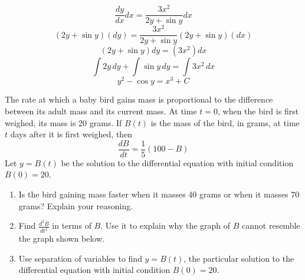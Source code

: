 \begin{Answer}[ref = diffeq1]
	$$\frac{dy}{dx} dx = \frac{3x^2}{2y + \sin{y}} dx$$
	$$(2y + \sin{y})(dy) = \frac{3x^2}{2y + \sin{y}}(2y + \sin{y})(dx)$$
	$$(2y + \sin{y})dy = (3x^2)dx$$
	$$\int 2y\,dy + \int \sin{y}\,dy = \int 3x^2\,dx$$
	$$y^2 - \cos{y} = x^3 + C$$
\end{Answer}

\begin{Exercise} The rate at which a baby bird gains 
mass is proportional to the difference between its adult mass and its current 
mass. At time $t = 0$, when the bird is first weighed, its mass is 20 grams. 
If $B(t)$ is the mass of the bird, in grams, at time $t$ days after it is 
first weighed, then $$\frac{dB}{dt} = \frac{1}{5} \left( 100 - B \right)$$
Let $y = B(t)$ be the solution to the differential equation with initial 
condition $B(0) = 20$. 
\begin{enumerate}
\item Is the bird gaining mass faster when it masses 40 grams or when it 
masses 70 grams? Explain your reasoning.
\item Find $\frac{d^2 B}{dt^2}$ in terms of $B$. Use it to explain why the 
graph of $B$ cannot resemble the graph shown below. 
\item Use separation of variables to find $y = B(t)$, the particular solution 
to the differential equation with initial condition $B(0) = 20$. 
\end{enumerate}
\end{Exercise}

